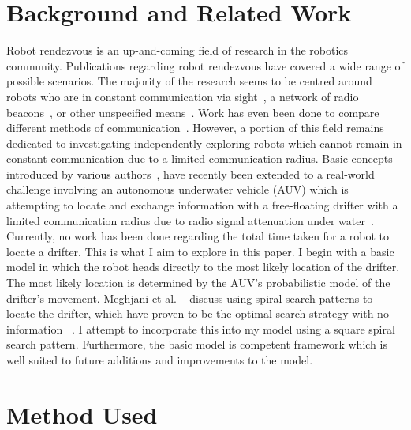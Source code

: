 \documentclass[a4paper, 11pt]{article} %
\begin{document}

\section*{Background and Related Work}

Robot rendezvous is an up-and-coming field of research in the robotics community. Publications regarding robot rendezvous have covered a wide range of possible scenarios. The majority of the research seems to be centred around robots who are in constant communication via sight~\cite{Rekleitis2001c}, a network of radio beacons~\cite{batalin2004}, or other unspecified means~\cite{burgard2000}\cite{rekleitis20082}. Work has even been done to compare different methods of communication~\cite{rekleitis20081}. However, a portion of this field remains dedicated to investigating independently exploring robots which cannot remain in constant communication due to a limited communication radius. Basic concepts introduced by various authors~\cite{Dudek97AAAIw}\cite{Roy2000}, have recently been extended to a real-world challenge involving an autonomous underwater vehicle (AUV) which is attempting to locate and exchange information with a free-floating drifter with a limited communication radius due to radio signal attenuation under water~\cite{meghjani14}. \\

\noindent Currently, no work has been done regarding the total time taken for a robot to locate a drifter. This is what I aim to explore in this paper. I begin with a basic model in which the robot heads directly to the most likely location of the drifter. The most likely location is determined by the AUV's probabilistic model of the drifter's movement. Meghjani et al. ~\cite{meghjani14} discuss using spiral search patterns to locate the drifter, which have proven to be the optimal search strategy with no information ~\cite{alpern2003}. I attempt to incorporate this into my model using a square spiral search pattern. Furthermore, the basic model is competent framework which is well suited to future additions and improvements to the model. 


\section*{Method Used}
\end{document}
